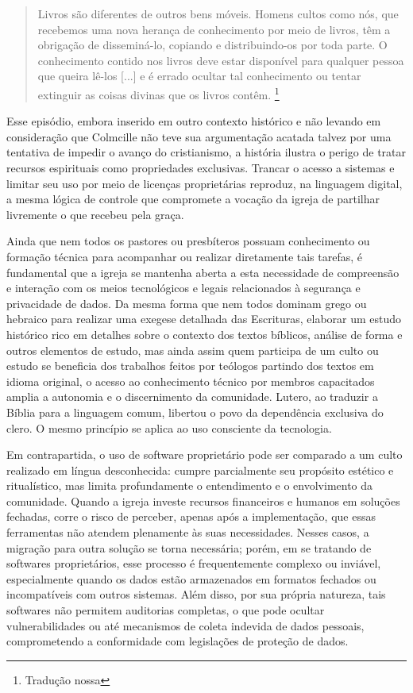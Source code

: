 \begin{quote}
Livros são diferentes de outros bens móveis. Homens cultos como nós, que recebemos uma nova herança de conhecimento por meio de livros, têm a obrigação de disseminá-lo, copiando e distribuindo-os por toda parte. O conhecimento contido nos livros deve estar disponível para qualquer pessoa que queira lê-los [...] e é errado ocultar tal conhecimento ou tentar extinguir as coisas divinas que os livros contêm. \cite[p.~40-42]{owens_dorean_2021}\footnote{Tradução nossa}
\end{quote}

Esse episódio, embora inserido em outro contexto histórico e não levando em consideração que Colmcille não teve sua argumentação acatada talvez por uma tentativa de impedir o avanço do cristianismo, a história ilustra o perigo de tratar recursos espirituais como propriedades exclusivas. Trancar o acesso a sistemas e limitar seu uso por meio de licenças proprietárias reproduz, na linguagem digital, a mesma lógica de controle que compromete a vocação da igreja de partilhar livremente o que recebeu pela graça.

Ainda que nem todos os pastores ou presbíteros possuam conhecimento ou formação técnica para acompanhar ou realizar diretamente tais tarefas, é fundamental que a igreja se mantenha aberta a esta necessidade de compreensão e interação com os meios tecnológicos e legais relacionados à segurança e privacidade de dados. Da mesma forma que nem todos dominam grego ou hebraico para realizar uma exegese detalhada das Escrituras, elaborar um estudo histórico rico em detalhes sobre o contexto dos textos bíblicos, análise de forma e outros elementos de estudo, mas ainda assim quem participa de um culto ou estudo se beneficia dos trabalhos feitos por teólogos partindo dos textos em idioma original, o acesso ao conhecimento técnico por membros capacitados amplia a autonomia e o discernimento da comunidade. Lutero, ao traduzir a Bíblia para a linguagem comum, libertou o povo da dependência exclusiva do clero. O mesmo princípio se aplica ao uso consciente da tecnologia.

Em contrapartida, o uso de software proprietário pode ser comparado a um culto realizado em língua desconhecida: cumpre parcialmente seu propósito estético e ritualístico, mas limita profundamente o entendimento e o envolvimento da comunidade. Quando a igreja investe recursos financeiros e humanos em soluções fechadas, corre o risco de perceber, apenas após a implementação, que essas ferramentas não atendem plenamente às suas necessidades. Nesses casos, a migração para outra solução se torna necessária; porém, em se tratando de softwares proprietários, esse processo é frequentemente complexo ou inviável, especialmente quando os dados estão armazenados em formatos fechados ou incompatíveis com outros sistemas. Além disso, por sua própria natureza, tais softwares não permitem auditorias completas, o que pode ocultar vulnerabilidades ou até mecanismos de coleta indevida de dados pessoais, comprometendo a conformidade com legislações de proteção de dados.

